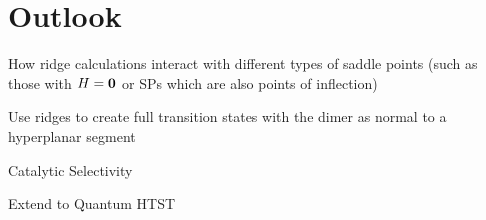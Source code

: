 \section{Outlook}
\label{sec:summary-outlook}

\bit
\item How ridge calculations interact with different types of saddle points (such as those with $H = {\mathrm{\mathbf{\bm{0}}}}$ or SPs which are also points of inflection)
\item Use ridges to create full transition states with the dimer as normal to a hyperplanar segment
\item Catalytic Selectivity
\item Extend to Quantum HTST
\eit

\placeholder
